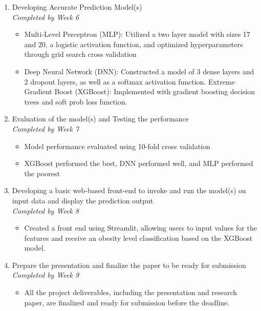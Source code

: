 \documentclass[11pt]{article}
\begin{document}
\begin{enumerate}
    \item Developing Accurate Prediction Model(s) \\
    \emph{Completed by Week 6}
    \begin{itemize}
        \item Multi-Level Perceptron (MLP): Utilized a two layer model with sizes 17 and 20, a logistic activation function, and optimized hyperparameters through grid search cross validation 
        \item Deep Neural Network (DNN): Constructed a model of 3 dense layers and 2 dropout layers, as well as a softmax activation function. 
Extreme Gradient Boost (XGBoost): Implemented with gradient boosting decision trees and soft prob loss function. 
    \end{itemize}
    
    \item Evaluation of the model(s) and Testing the performance \\
    \emph{Completed by Week 7}
    \begin{itemize}
        \item Model performance evaluated using 10-fold cross validation
        \item XGBoost performed the best, DNN performed well, and MLP performed the poorest
    \end{itemize}
    
    \item Developing a basic web-based front-end to invoke and run the model(s) on input data and display the prediction output \\ 
    \emph{Completed by Week 8}
    \begin{itemize}
        \item Created a front end using Streamlit, allowing users to input values for the features and receive an obesity level classification based on the XGBoost model.
    \end{itemize}
     
    \item Prepare the presentation and finalize the paper to be ready for submission \\ 
    \emph{Completed by Week 9}
    \begin{itemize}
        \item All the project deliverables, including the presentation and research paper, are finalized and ready for submission before the deadline. 
    \end{itemize}

\end{enumerate}
\end{document}
